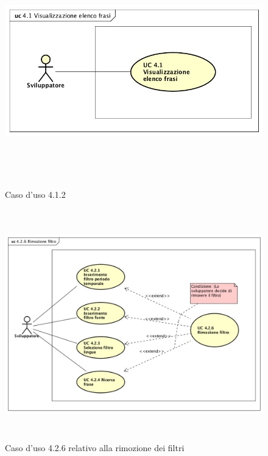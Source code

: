 \begin{figure}[H]
\centering
\includegraphics[width=17cm, height=10cm]{img/UC410.png} 
\caption{Caso d'uso 4.1.2}\label{fig:420}
\end{figure}
\begin{figure}[H]
\centering
\includegraphics[width=17cm, height=10cm]{img/UC426.png} 
\caption{Caso d'uso 4.2.6 relativo alla rimozione dei filtri}\label{fig:426}
\end{figure}
